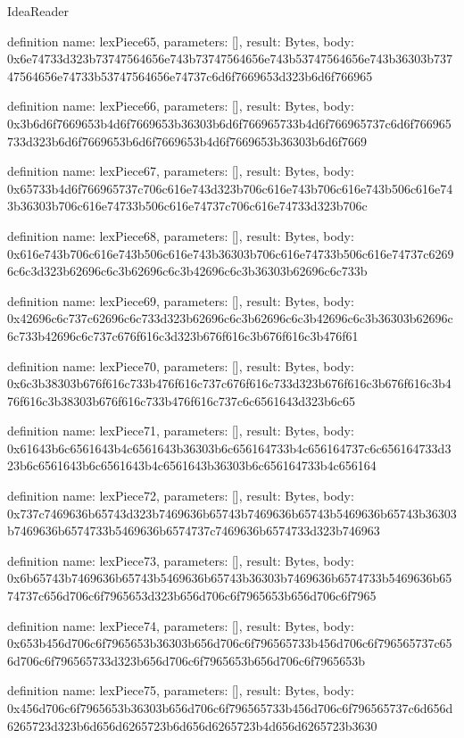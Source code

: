 \begin{lexlean}{IdeaReader}
\begin{semanticmodule}
definition{
  name: lexPiece65,
  parameters: [],
  result: Bytes,
  body: 0x6e74733d323b73747564656e743b73747564656e743b53747564656e743b36303b73747564656e74733b53747564656e74737c6d6f7669653d323b6d6f766965
}

definition{
  name: lexPiece66,
  parameters: [],
  result: Bytes,
  body: 0x3b6d6f7669653b4d6f7669653b36303b6d6f766965733b4d6f766965737c6d6f766965733d323b6d6f7669653b6d6f7669653b4d6f7669653b36303b6d6f7669
}

definition{
  name: lexPiece67,
  parameters: [],
  result: Bytes,
  body: 0x65733b4d6f766965737c706c616e743d323b706c616e743b706c616e743b506c616e743b36303b706c616e74733b506c616e74737c706c616e74733d323b706c
}

definition{
  name: lexPiece68,
  parameters: [],
  result: Bytes,
  body: 0x616e743b706c616e743b506c616e743b36303b706c616e74733b506c616e74737c62696c6c3d323b62696c6c3b62696c6c3b42696c6c3b36303b62696c6c733b
}

definition{
  name: lexPiece69,
  parameters: [],
  result: Bytes,
  body: 0x42696c6c737c62696c6c733d323b62696c6c3b62696c6c3b42696c6c3b36303b62696c6c733b42696c6c737c676f616c3d323b676f616c3b676f616c3b476f61
}

definition{
  name: lexPiece70,
  parameters: [],
  result: Bytes,
  body: 0x6c3b38303b676f616c733b476f616c737c676f616c733d323b676f616c3b676f616c3b476f616c3b38303b676f616c733b476f616c737c6c6561643d323b6c65
}

definition{
  name: lexPiece71,
  parameters: [],
  result: Bytes,
  body: 0x61643b6c6561643b4c6561643b36303b6c656164733b4c656164737c6c656164733d323b6c6561643b6c6561643b4c6561643b36303b6c656164733b4c656164
}

definition{
  name: lexPiece72,
  parameters: [],
  result: Bytes,
  body: 0x737c7469636b65743d323b7469636b65743b7469636b65743b5469636b65743b36303b7469636b6574733b5469636b6574737c7469636b6574733d323b746963
}

definition{
  name: lexPiece73,
  parameters: [],
  result: Bytes,
  body: 0x6b65743b7469636b65743b5469636b65743b36303b7469636b6574733b5469636b6574737c656d706c6f7965653d323b656d706c6f7965653b656d706c6f7965
}

definition{
  name: lexPiece74,
  parameters: [],
  result: Bytes,
  body: 0x653b456d706c6f7965653b36303b656d706c6f796565733b456d706c6f796565737c656d706c6f796565733d323b656d706c6f7965653b656d706c6f7965653b
}

definition{
  name: lexPiece75,
  parameters: [],
  result: Bytes,
  body: 0x456d706c6f7965653b36303b656d706c6f796565733b456d706c6f796565737c6d656d6265723d323b6d656d6265723b6d656d6265723b4d656d6265723b3630
}


\end{semanticmodule}
\end{lexlean}
